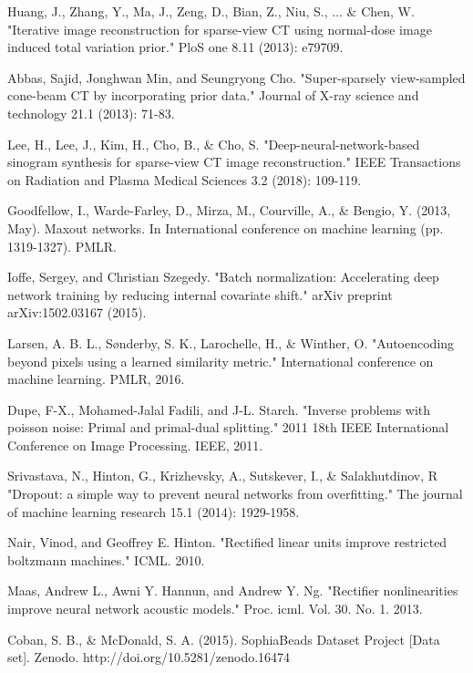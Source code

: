 \begin{thebibliography}{00}
Huang, J., Zhang, Y., Ma, J., Zeng, D., Bian, Z., Niu, S., ... \& Chen, W. "Iterative image reconstruction for sparse-view CT using normal-dose image induced total variation prior." PloS one 8.11 (2013): e79709.

Abbas, Sajid, Jonghwan Min, and Seungryong Cho. "Super-sparsely view-sampled cone-beam CT by incorporating prior data." Journal of X-ray science and technology 21.1 (2013): 71-83.

Lee, H., Lee, J., Kim, H., Cho, B., \& Cho, S.  "Deep-neural-network-based sinogram synthesis for sparse-view CT image reconstruction." IEEE Transactions on Radiation and Plasma Medical Sciences 3.2 (2018): 109-119.



Goodfellow, I., Warde-Farley, D., Mirza, M., Courville, A., \& Bengio, Y. (2013, May). Maxout networks. In International conference on machine learning (pp. 1319-1327). PMLR.


Ioffe, Sergey, and Christian Szegedy. "Batch normalization: Accelerating deep network training by reducing internal covariate shift." arXiv preprint arXiv:1502.03167 (2015).

Larsen, A. B. L., Sønderby, S. K., Larochelle, H., \& Winther, O. "Autoencoding beyond pixels using a learned similarity metric." International conference on machine learning. PMLR, 2016.

Dupe, F-X., Mohamed-Jalal Fadili, and J-L. Starch. "Inverse problems with poisson noise: Primal and primal-dual splitting." 2011 18th IEEE International Conference on Image Processing. IEEE, 2011.

 Srivastava, N., Hinton, G., Krizhevsky, A., Sutskever, I., \& Salakhutdinov, R "Dropout: a simple way to prevent neural networks from overfitting." The journal of machine learning research 15.1 (2014): 1929-1958.

Nair, Vinod, and Geoffrey E. Hinton. "Rectified linear units improve restricted boltzmann machines." ICML. 2010.

Maas, Andrew L., Awni Y. Hannun, and Andrew Y. Ng. "Rectifier nonlinearities improve neural network acoustic models." Proc. icml. Vol. 30. No. 1. 2013.

Coban, S. B., \& McDonald, S. A. (2015). SophiaBeads Dataset Project [Data set]. Zenodo. http://doi.org/10.5281/zenodo.16474


\end{thebibliography}
